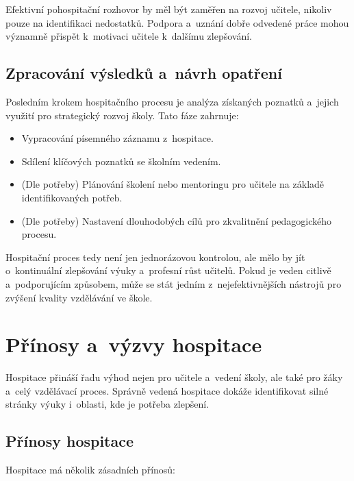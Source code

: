 Efektivní pohospitační rozhovor by měl být zaměřen na rozvoj učitele, nikoliv pouze na identifikaci nedostatků. Podpora a~uznání dobře odvedené práce mohou významně přispět k~motivaci učitele k~dalšímu zlepšování.

\subsection{Zpracování výsledků a~návrh opatření}

Posledním krokem hospitačního procesu je analýza získaných poznatků a~jejich využití pro strategický rozvoj školy. Tato fáze zahrnuje:

\begin{itemize}
    \item Vypracování písemného záznamu z~hospitace.
    \item Sdílení klíčových poznatků se školním vedením.
    \item (Dle potřeby) Plánování školení nebo mentoringu pro učitele na základě identifikovaných potřeb.
    \item (Dle potřeby) Nastavení dlouhodobých cílů pro zkvalitnění pedagogického procesu.
\end{itemize}

Hospitační proces tedy není jen jednorázovou kontrolou, ale mělo by jít o~kontinuální zlepšování výuky a~profesní růst učitelů. Pokud je veden citlivě a~podporujícím způsobem, může se stát jedním z~nejefektivnějších nástrojů pro zvýšení kvality vzdělávání ve škole.

\section{Přínosy a~výzvy hospitace}

Hospitace přináší řadu výhod nejen pro učitele a~vedení školy, ale také pro žáky a~celý vzdělávací proces. Správně vedená hospitace dokáže identifikovat silné stránky výuky i~oblasti, kde je potřeba zlepšení.


\subsection{Přínosy hospitace}

Hospitace má několik zásadních přínosů:

